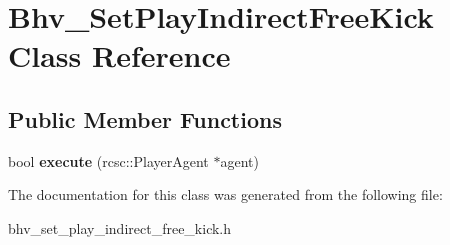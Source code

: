 \hypertarget{classBhv__SetPlayIndirectFreeKick}{
\section{Bhv\_\-SetPlayIndirectFreeKick Class Reference}
\label{classBhv__SetPlayIndirectFreeKick}
}
\subsection*{Public Member Functions}
\begin{DoxyCompactItemize}
\item 
\hypertarget{classBhv__SetPlayIndirectFreeKick_af37f9b1fc6c17a2f9b7ec912c7dd6a2f}{
bool {\bfseries execute} (rcsc::PlayerAgent $\ast$agent)}
\label{classBhv__SetPlayIndirectFreeKick_af37f9b1fc6c17a2f9b7ec912c7dd6a2f}

\end{DoxyCompactItemize}


The documentation for this class was generated from the following file:\begin{DoxyCompactItemize}
\item 
bhv\_\-set\_\-play\_\-indirect\_\-free\_\-kick.h\end{DoxyCompactItemize}
